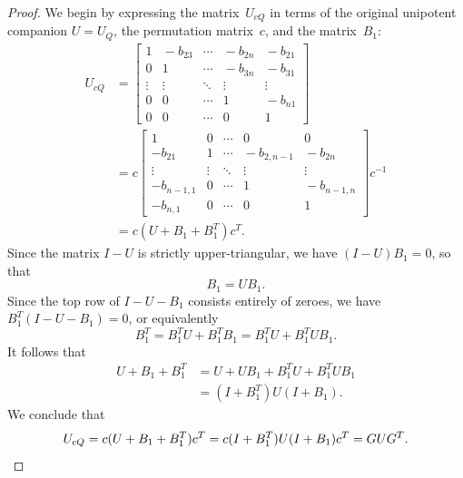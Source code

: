\documentclass[11pt, letterpaper]{amsart}
\theoremstyle{definition}
\numberwithin{equation}{section}
\begin{document}
\begin{proof}
We begin by expressing the matrix~$U_{cQ}$ in terms of the original unipotent companion $U=U_Q$, 
the permutation matrix~$c$, and the matrix~$B_1$: 
\begin{align*}
U_{cQ}&=
\begin{bmatrix}
1 & \!-b_{23}\! &  \cdots & \!-b_{2n}\! & \!-b_{21} \\
0 & 1 &  \cdots & \!-b_{3n}\! & \!-b_{31}\\
\vdots &  \vdots & \ddots & \vdots & \vdots  \\
0 & 0 &  \cdots & 1 & \!-b_{n1} \\
0 & 0 &  \cdots & 0 & 1 
\end{bmatrix}
\\
&=
c
\begin{bmatrix}
1 & 0 &  \cdots & 0 & 0 \\
-b_{21} & 1 &  \cdots & \!-b_{2,n-1}\! & \!-b_{2n}\\
\vdots &  \vdots & \ddots & \vdots & \vdots  \\
-b_{n-1,1} & 0 &  \cdots & 1 & \!-b_{n-1,n}\! \\
-b_{n,1} & 0 &  \cdots & 0 & 1 
\end{bmatrix}
c^{-1} \\
&=c(U+B_1+B_1^T) c^T.
\end{align*}
Since the matrix $I-U$ is strictly upper-triangular, we have $(I-U)B_1=0$, so that 
\begin{equation*}
B_1 = UB_1. 
\end{equation*}
Since the top row of $I-U-B_1$ consists entirely of zeroes, we have
$B_1^T (I-U-B_1)=0$, or equivalently
\begin{equation*}
B_1^T = B_1^T U + B_1^T B_1= B_1^T U + B_1^T UB_1. 
\end{equation*}
It follows that 
\begin{align*}
U+B_1+B_1^T %
&= U + UB_1 + B_1^T U + B_1^T U B_1 \\
&= (I+B_1^T)U(I+B_1). 
\end{align*}
We conclude that 
\begin{equation*}
U_{cQ} = c(U+B_1+B_1^T) c^T = c (I+B_1^T)U(I+B_1) c^T =G U G^T. 
\qedhere
\end{equation*}
\end{proof}
\end{document}
